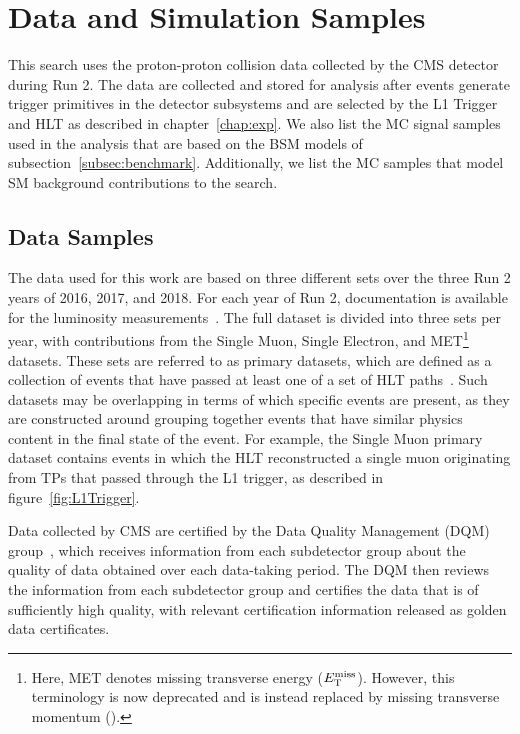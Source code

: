 
\section{Data and Simulation Samples}
\label{sec:samples}

This search uses the proton-proton collision data collected by the CMS detector during Run 2.
The data are collected and stored for analysis after events generate trigger primitives in the detector subsystems and are selected by the L1 Trigger and HLT as described in chapter~\ref{chap:exp}.
We also list the MC signal samples used in the analysis that are based on the BSM models of subsection~\ref{subsec:benchmark}.
Additionally, we list the MC samples that model SM background contributions to the search.

\subsection{Data Samples}

The data used for this work are based on three different sets over the three Run 2 years of 2016, 2017, and 2018.
For each year of Run 2, documentation is available for the luminosity measurements~\cite{CMS-PAS-LUM-17-001,CMS-PAS-LUM-17-004,CMS-PAS-LUM-18-002}.
The full dataset is divided into three sets per year, with contributions from the Single Muon, Single Electron, and MET\footnote{Here, MET denotes missing transverse energy ($E_\mathrm{T}^\mathrm{miss}$).
However, this terminology is now deprecated and is instead replaced by missing transverse momentum (\ptmiss).} datasets.
These sets are referred to as primary datasets, which are defined as a collection of events that have passed at least one of a set of HLT paths~\cite{Franzoni2016}.
Such datasets may be overlapping in terms of which specific events are present, as they are constructed around grouping together events that have similar physics content in the final state of the event.
For example, the Single Muon primary dataset contains events in which the HLT reconstructed a single muon originating from TPs that passed through the L1 trigger, as described in figure~\ref{fig:L1Trigger}.

Data collected by CMS are certified by the Data Quality Management (DQM) group~\cite{CMSData}, which receives information from each subdetector group about the quality of data obtained over each data-taking period.
The DQM then reviews the information from each subdetector group and certifies the data that is of sufficiently high quality, with relevant certification information released as golden data certificates.

